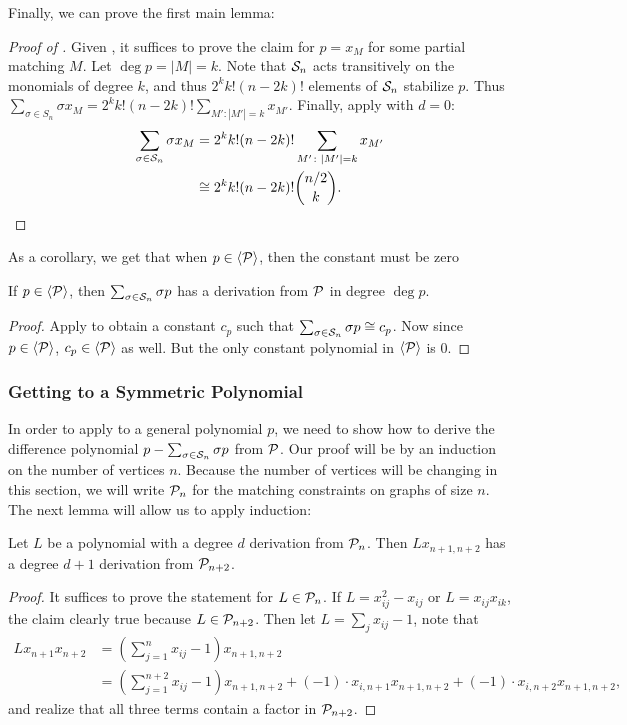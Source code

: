 Finally, we can prove the first main lemma:
\begin{proof}[Proof of ]
Given ,
it suffices to prove the claim for
\(p = x_{M}\) for some partial matching \(M\).
Let $\deg p = |M| = k$.
Note that $\mathcal S_n$ acts transitively on the monomials of degree $k$, and thus $2^k k! (n-2k)!$ elements of $\mathcal S_n$ stabilize $p$.
Thus $\sum_{\sigma \in S_n} \sigma x_M = 2^k k! (n-2k)!\sum_{M': |M'| = k} x_{M'}$.
Finally, apply  with $d = 0$:
\begin{equation*}
  \begin{split}
  \sum_{\sigma \in \mathcal S_{n}} \sigma x_{M}
  &= 2^{k} k! (n-2k)! \sum_{M' \colon \left|M'\right| = k} x_{M'} \\
  &\cong
  2^{k} k! (n-2k)! \binom{n/2}{k}.
  \end{split}
\end{equation*}
\end{proof}
As a corollary, we get that when $p \in \langle \mathcal P \rangle$, then the constant must be zero 
\begin{corollary}\label{cor:constantiszero}
If $p \in \langle \mathcal P \rangle$, then $\sum_{\sigma \in \mathcal S_n} \sigma p$ has a derivation from $\mathcal P$ in degree $\deg p$.
\end{corollary}
\begin{proof}
Apply  to obtain a constant $c_p$ such that $\sum_{\sigma \in \mathcal S_n} \sigma p \cong c_p$. 
Now since $p \in \langle \mathcal P \rangle$, $c_p \in \langle \mathcal P \rangle$ as well. But the only constant polynomial in $\langle \mathcal P \rangle$ is $0$.
\end{proof}

\subsubsection{Getting to a Symmetric Polynomial}
In order to apply  to a general polynomial $p$, we need to show how to derive the difference polynomial $p - \sum_{\sigma \in \mathcal S_n} \sigma p$ from $\mathcal P$. Our proof will be by an induction on the number of vertices $n$. Because the number of vertices will be changing in this section, we will write $\mathcal P_n$ for the matching constraints on graphs of size $n$. 
The next lemma will allow us to apply induction:
\begin{lemma}
  \label{lem:degree-increase}
  Let \(L\) be a polynomial with a degree $d$ derivation from $\mathcal P_{n}$.
	Then $Lx_{n+1,n+2}$ has a degree $d+1$ derivation from $\mathcal P_{n+2}$.
\end{lemma}
\begin{proof}
It suffices to prove the statement for $L \in \mathcal P_n$. 
If $L = x_{ij}^2 - x_{ij}$ or $L = x_{ij}x_{ik}$, the claim clearly true because $L \in \mathcal P_{n+2}$.
Then let $L = \sum_j x_{ij} - 1$, note that 
\begin{align*}
Lx_{n+1}x_{n+2} &= (\sum_{j=1}^n x_{ij} - 1)x_{n+1,n+2} \\
&= (\sum_{j=1}^{n+2} x_{ij} - 1)x_{n+1,n+2} + (-1)\cdot x_{i,n+1}x_{n+1,n+2} + (-1)\cdot x_{i,n+2}x_{n+1,n+2},
\end{align*}
and realize that all three terms contain a factor in $\mathcal P_{n+2}$.
\end{proof}

